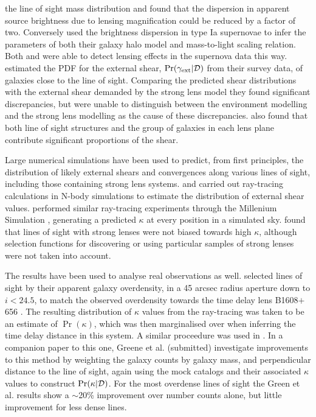 \documentclass[useAMS,usenatbib]{mn2e}
\begin{document}
the line of sight mass distribution and found that the dispersion in
apparent source brightness due to lensing magnification could be reduced
by a factor of two. Conversely \citet{KarpenkaEtal2012} used the brightness dispersion in type Ia supernovae to infer the parameters of both their galaxy halo model and mass-to-light scaling relation. Both \citeauthor{KarpenkaEtal2012} and \citet{JonssonEtal2010} were able to 
detect lensing effects in the supernova data this way.
%
\citet{WongEtal2011} estimated the PDF for the external shear,
$\Pr(\gamma_{\rm ext}|{\mathcal{D}})$ from their survey data,
\citep{WilliamsEtal2006;MomchevaEtal2006} of galaxies close to the line
of sight. Comparing the predicted shear
distributions with the external shear demanded by the strong lens model 
they found significant
discrepancies, but were unable to distinguish between the environment
modelling and the strong lens modelling as the cause of these
discrepancies. \citeauthor{WongEtal2011} also found that both line of
sight structures and the group of galaxies in each lens plane contribute
significant proportions of the shear. 

Large numerical simulations have been used to
predict, from first principles, the distribution of likely external
shears and convergences along various lines of sight, including those
containing strong lens systems.  \citet{Holder+Schechter2003} and
\citet{DalalEtal2005} carried out ray-tracing calculations in N-body
simulations to estimate the distribution of external shear values. 
\citet{HilbertEtal2009} performed similar ray-tracing experiments
through the Millenium Simulation \citep{SpringelEtal2005}, generating a
predicted $\kappa$ at every position in a simulated sky.
\citet{HilbertEtal2009} found that \MS lines of sight with strong lenses
were not biased towards high $\kappa$, although selection functions for
discovering or using particular samples of strong lenses were not taken
into account.

The \MS results have been used to analyse real observations as well. 
\citet{SuyuEtal2010} selected \MS lines of sight by their apparent
galaxy overdensity, in a 45 arcsec radius aperture down to $i < 24.5$,
to match the observed overdensity towards the time delay lens
B1608$+$656 \citep{FassnachtEtal2011}.  The resulting distribution of
$\kappa$ values from the ray-tracing was taken to be an estimate of 
$\Pr(\kappa)$, which was then marginalised over when inferring the time
delay distance in this system. A similar proceedure was used in \citet{SuyuEtal2012b}.
In a companion paper to this one, Greene et al. (submitted) investigate
improvements to this method by weighting the galaxy counts by galaxy
mass, and perpendicular distance to the line of sight, again using the
\MS mock catalogs and their associated $\kappa$ values to construct
$\Pr(\kappa|{\mathcal{D}})$. For the most overdense lines of sight the
Green et al. results  show a $\sim$20\% improvement over
number counts alone, but little improvement for less dense lines.
\end{document}
